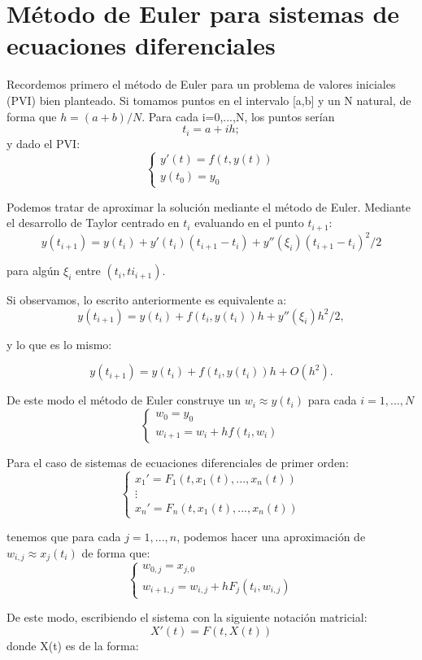 \documentclass[12pt]{article}       %
\begin{document}
\section{Método de Euler para sistemas de ecuaciones diferenciales}

Recordemos primero el método de Euler para un problema de valores iniciales (PVI) bien planteado. Si tomamos puntos en el intervalo [a,b] y un N natural, de forma que $h=(a+b)/N$. Para cada i=0,...,N, los puntos serían
$$ 
t_i=a+ih;
$$
y dado el PVI:
$$
\begin{cases}
y'(t)=f(t,y(t)) \\ 
y(t_0)=y_0
\end{cases}
$$

Podemos tratar de aproximar la solución mediante el método de Euler. Mediante el desarrollo de Taylor centrado en $t_i$ evaluando en el punto $t_{i+1}$:
$$
y(t_{i+1})=y(t_i) + y'(t_i)(t_{i+1}-t_i) + y''(\xi_i)(t_{i+1}-t_i)^2/2
$$

para algún $\xi_i$ entre $(t_i, ti_{i+1})$.

Si observamos, lo escrito anteriormente es equivalente a:
$$
y(t_{i+1})=y(t_i) + f(t_i,y(t_i))h + y''(\xi_i)h^2/2,
$$ 

y lo que es lo mismo:

$$
y(t_{i+1})=y(t_i) + f(t_i,y(t_i))h + O(h^2).
$$

De este modo el método de Euler construye un $w_i \approx y(t_i)$ para cada $i=1,...,N$
$$
\begin{cases}
w_0=y_0\\
w_{i+1}=w_i + hf(t_i,w_i)
\end{cases}
$$

Para el caso de sistemas de ecuaciones diferenciales de primer orden:
$$
\begin{cases}
x_1'=F_1(t,x_1(t),...,x_n(t)) \\
\vdots\\
x_n'=F_n(t,x_1(t),...,x_n(t))
\end{cases}
$$

tenemos que para cada $j=1,...,n$, podemos hacer una aproximación de $w_{i,j} \approx x_j(t_i)$ de forma que:
$$
\begin{cases}
w_{0,j}=x_{j,0} \\
w_{i+1,j}=w_{i,j}+ hF_j(t_i,w_{i,j})
\end{cases}
$$

De este modo, escribiendo el sistema con la siguiente notación matricial:
$$
X'(t)=F(t,X(t))
$$
donde X(t) es de la forma:
\end{document}
